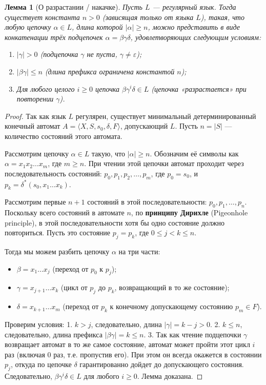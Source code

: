 \documentclass[12pt,a4paper]{article}
\theoremstyle{definition}
\theoremstyle{plain}
\newtheorem{lemma}{Лемма}
\theoremstyle{remark}
\begin{document}
\begin{lemma}[О разрастании / накачке]
Пусть $L$ — регулярный язык. Тогда существует константа $n > 0$ (зависящая только от языка $L$), такая, что любую цепочку $\alpha \in L$, длина которой $|\alpha| \ge n$, можно представить в виде конкатенации трёх подцепочек $\alpha = \beta\gamma\delta$, удовлетворяющих следующим условиям:
\begin{enumerate}
    \item $|\gamma| > 0$ (подцепочка $\gamma$ не пуста, $\gamma \neq \varepsilon$);
    \item $|\beta\gamma| \le n$ (длина префикса ограничена константой $n$);
    \item Для любого целого $i \ge 0$ цепочка $\beta\gamma^i\delta \in L$ (цепочка «разрастается» при повторении $\gamma$).
\end{enumerate}
\end{lemma}

\begin{proof}
Так как язык $L$ регулярен, существует минимальный детерминированный конечный автомат $A = \langle X, S, s_0, \delta, F \rangle$, допускающий $L$. Пусть $n = |S|$ — количество состояний этого автомата.

Рассмотрим цепочку $\alpha \in L$ такую, что $|\alpha| \ge n$. Обозначим её символы как $\alpha = x_1 x_2 \dots x_m$, где $m \ge n$. При чтении этой цепочки автомат проходит через последовательность состояний:
$p_0, p_1, p_2, \dots, p_m$,
где $p_0 = s_0$, и $p_k = \delta^*(s_0, x_1\dots x_k)$.

Рассмотрим первые $n+1$ состояний в этой последовательности: $p_0, p_1, \dots, p_n$. Поскольку всего состояний в автомате $n$, по \textbf{принципу Дирихле} (Pigeonhole principle), в этой последовательности хотя бы одно состояние должно повториться. Пусть это состояние $p_j = p_k$, где $0 \le j < k \le n$.

Тогда мы можем разбить цепочку $\alpha$ на три части:
\begin{itemize}
    \item $\beta = x_1 \dots x_j$ (переход от $p_0$ к $p_j$);
    \item $\gamma = x_{j+1} \dots x_k$ (цикл от $p_j$ до $p_k$, возвращающий в то же состояние);
    \item $\delta = x_{k+1} \dots x_m$ (переход от $p_k$ к конечному допускающему состоянию $p_m \in F$).
\end{itemize}
Проверим условия:
1. $k > j$, следовательно, длина $|\gamma| = k - j > 0$.
2. $k \le n$, следовательно, длина префикса $|\beta\gamma| = k \le n$.
3. Так как чтение подцепочки $\gamma$ возвращает автомат в то же самое состояние, автомат может пройти этот цикл $i$ раз (включая $0$ раз, т.е. пропустив его). При этом он всегда окажется в состоянии $p_j$, откуда по цепочке $\delta$ гарантированно дойдет до допускающего состояния. Следовательно, $\beta\gamma^i\delta \in L$ для любого $i \ge 0$. Лемма доказана.
\end{proof}
\end{document}
